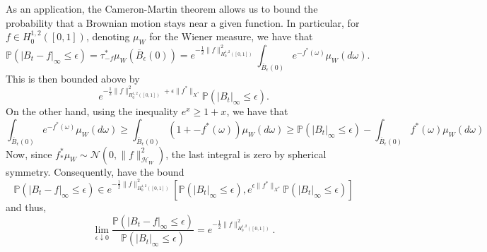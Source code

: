 \documentclass{article}
\begin{document}
As an application, the Cameron-Martin theorem allows us to bound the probability that a Brownian motion
stays near a given function. In particular, for \(f \in H^{1, 2}_0([0, 1])\), denoting \(\mu_W\) for the
Wiener measure, we have that
\[\mathbb{P}(|B_t - f|_\infty \le \epsilon) = \tau_{-f}^* \mu_W(\overline B_\epsilon(0))
= e^{-\frac{1}{2}\|f\|^2_{H^{1, 2}_0([0, 1])}} \int_{\overline B_\epsilon(0)} e^{- f^*(\omega)} \mu_W(d \omega).\]
This is then bounded above by
\[e^{-\frac{1}{2}\|f\|^2_{H^{1, 2}_0([0, 1])} + \epsilon \|f^*\|_{X^*}} \mathbb{P}(|B_t|_\infty \le \epsilon).\]
On the other hand, using the inequality \(e^x \ge 1 + x\), we have that
\[\int_{\overline B_\epsilon(0)} e^{- f^*(\omega)} \mu_W(d \omega) \ge
\int_{\overline B_\epsilon(0)} (1 + - f^*(\omega)) \mu_W(d \omega)
\ge \mathbb{P}(|B_t|_\infty \le \epsilon) - \int_{\overline B_\epsilon(0)} f^*(\omega) \mu_W(d \omega)\]
Now, since \(f^*_* \mu_W \sim \mathcal{N}(0, \|f\|_{\mathcal{H}_W}^2)\), the last integral is zero by spherical symmetry.
Consequently, have the bound
\[\mathbb{P}(|B_t - f|_\infty \le \epsilon) \in
e^{-\frac{1}{2}\|f\|^2_{H^{1, 2}_0([0, 1])}}
\left[\mathbb{P}(|B_t|_\infty \le \epsilon), e^{\epsilon \|f^*\|_{X^*}}\mathbb{P}(|B_t|_\infty \le \epsilon)\right]\]
and thus,
\[\lim_{\epsilon \downarrow 0} \frac{\mathbb{P}(|B_t - f|_\infty \le \epsilon)}{\mathbb{P}(|B_t|_\infty \le \epsilon)}
= e^{-\frac{1}{2}\|f\|^2_{H^{1, 2}_0([0, 1])}}.\]
\end{document}
